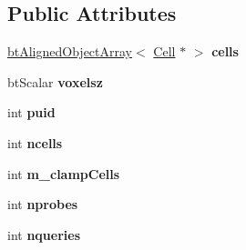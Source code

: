 \subsection*{Public Attributes}
\begin{DoxyCompactItemize}
\item 
\hypertarget{structbt_sparse_sdf_a96994688745162aae2fbaa80987b82f6}{\hyperlink{classbt_aligned_object_array}{bt\+Aligned\+Object\+Array}$<$ \hyperlink{structbt_sparse_sdf_1_1_cell}{Cell} $\ast$ $>$ {\bfseries cells}}\label{structbt_sparse_sdf_a96994688745162aae2fbaa80987b82f6}

\item 
\hypertarget{structbt_sparse_sdf_af08d0b4463c5dd5dffddb172b2095705}{bt\+Scalar {\bfseries voxelsz}}\label{structbt_sparse_sdf_af08d0b4463c5dd5dffddb172b2095705}

\item 
\hypertarget{structbt_sparse_sdf_aff0dcb600fe35b805e95f48d205ab17b}{int {\bfseries puid}}\label{structbt_sparse_sdf_aff0dcb600fe35b805e95f48d205ab17b}

\item 
\hypertarget{structbt_sparse_sdf_a04622e2f419471b6976d817e8a7327e7}{int {\bfseries ncells}}\label{structbt_sparse_sdf_a04622e2f419471b6976d817e8a7327e7}

\item 
\hypertarget{structbt_sparse_sdf_a8bca9c6ebbe23a19d02127a81260dc55}{int {\bfseries m\+\_\+clamp\+Cells}}\label{structbt_sparse_sdf_a8bca9c6ebbe23a19d02127a81260dc55}

\item 
\hypertarget{structbt_sparse_sdf_a937be99aca40d5cbedf8357a21ab765d}{int {\bfseries nprobes}}\label{structbt_sparse_sdf_a937be99aca40d5cbedf8357a21ab765d}

\item 
\hypertarget{structbt_sparse_sdf_ac5a660d252157f0cd9de683951921bc0}{int {\bfseries nqueries}}\label{structbt_sparse_sdf_ac5a660d252157f0cd9de683951921bc0}

\end{DoxyCompactItemize}


